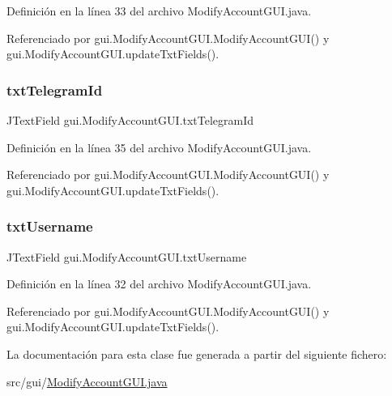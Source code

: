 Definición en la línea 33 del archivo Modify\+Account\+G\+U\+I.\+java.



Referenciado por gui.\+Modify\+Account\+G\+U\+I.\+Modify\+Account\+G\+U\+I() y gui.\+Modify\+Account\+G\+U\+I.\+update\+Txt\+Fields().

\mbox{\label{classgui_1_1_modify_account_g_u_i_ab28de7ad0595e732310c6d55c763bf5d}} 
\subsubsection{\texorpdfstring{txtTelegramId}{txtTelegramId}}
{\footnotesize\ttfamily J\+Text\+Field gui.\+Modify\+Account\+G\+U\+I.\+txt\+Telegram\+Id\hspace{0.3cm}{\ttfamily [private]}}



Definición en la línea 35 del archivo Modify\+Account\+G\+U\+I.\+java.



Referenciado por gui.\+Modify\+Account\+G\+U\+I.\+Modify\+Account\+G\+U\+I() y gui.\+Modify\+Account\+G\+U\+I.\+update\+Txt\+Fields().

\mbox{\label{classgui_1_1_modify_account_g_u_i_af8c1603f6af69f39c0d0a29a8aa2b568}} 
\subsubsection{\texorpdfstring{txtUsername}{txtUsername}}
{\footnotesize\ttfamily J\+Text\+Field gui.\+Modify\+Account\+G\+U\+I.\+txt\+Username\hspace{0.3cm}{\ttfamily [private]}}



Definición en la línea 32 del archivo Modify\+Account\+G\+U\+I.\+java.



Referenciado por gui.\+Modify\+Account\+G\+U\+I.\+Modify\+Account\+G\+U\+I() y gui.\+Modify\+Account\+G\+U\+I.\+update\+Txt\+Fields().



La documentación para esta clase fue generada a partir del siguiente fichero\+:\begin{DoxyCompactItemize}
\item 
src/gui/\mbox{\hyperlink{_modify_account_g_u_i_8java}{Modify\+Account\+G\+U\+I.\+java}}\end{DoxyCompactItemize}
